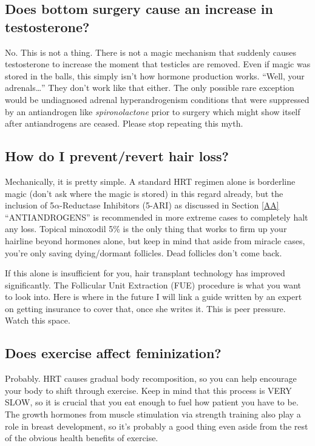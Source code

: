 \documentclass{article}
\begin{document}
\subsection{Does bottom surgery cause an increase in testosterone?}

No. This is not a thing. There is not a magic mechanism that suddenly causes testosterone to increase the moment that testicles are removed. Even if magic was stored in the balls, this simply isn’t how hormone production works. “Well, your adrenals…” They don’t work like that either. The only possible rare exception would be undiagnosed adrenal hyperandrogenism conditions that were suppressed by an antiandrogen like \textit{spironolactone }prior to surgery which might show itself after antiandrogens are ceased. Please stop repeating this myth.

\subsection{How do I prevent/revert hair loss?}\label{11-14}

Mechanically, it is pretty simple. A standard HRT regimen alone is borderline magic (don’t ask where the magic is stored) in this regard already, but the inclusion of 5$\alpha$-Reductase Inhibitors (5-ARI) as discussed in Section \ref{AA} “ANTIANDROGENS” is recommended in more extreme cases to completely halt any loss. Topical minoxodil 5\% is the only thing that works to firm up your hairline beyond hormones alone, but keep in mind that aside from miracle cases, you’re only saving dying/dormant follicles. Dead follicles don’t come back.

If this alone is insufficient for you, hair transplant technology has improved significantly. The Follicular Unit Extraction (FUE) procedure is what you want to look into. Here is where in the future I will link a guide written by an expert on getting insurance to cover that, once she writes it. This is peer pressure. Watch this space.

\subsection{Does exercise affect feminization?}

Probably. HRT causes gradual body recomposition, so you can help encourage your body to shift through exercise. Keep in mind that this process is VERY SLOW, so it is crucial that you eat enough to fuel how patient you have to be. The growth hormones from muscle stimulation via strength training also play a role in breast development, so it’s probably a good thing even aside from the rest of the obvious health benefits of exercise.
\end{document}

